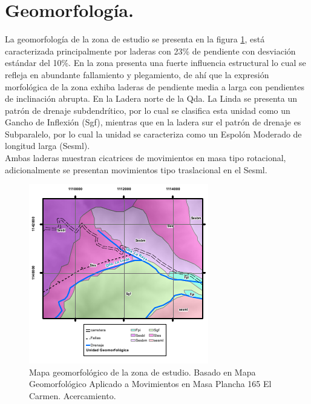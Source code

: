 \section{Geomorfolog\'{i}a.}
La geomorfolog\'{i}a de la zona de estudio se presenta en la figura \ref{fig:mapageomorfo}, est\'{a} caracterizada principalmente por laderas con 23\% de pendiente con desviaci\'{o}n est\'{a}ndar del 10\%.
En la zona presenta una fuerte influencia estructural lo cual se refleja en abundante fallamiento y plegamiento, de ah\'i que la expresi\'{o}n morfol\'{o}gica de la zona exhiba laderas de pendiente media a larga con pendientes de inclinaci\'{o}n abrupta. En la Ladera norte de la Qda. La Linda se presenta un patr\'{o}n de drenaje subdendr\'{i}tico, por lo cual se clasifica esta unidad como un Gancho de Inflexi\'{o}n (Sgf), mientras que en la ladera sur el patr\'{o}n de drenaje es Subparalelo, por lo cual la unidad se caracteriza como un Espol\'{o}n Moderado de longitud larga (Sesml).  \\
Ambas laderas muestran cicatrices de movimientos en masa tipo rotacional, adicionalmente se presentan movimientos tipo traslacional en el Sesml.\cite{urrao} 
 \par


\begin{figure}[H]
\centering

\includegraphics[width=.8\textwidth]{img/geomorfo.pdf}
\caption{Mapa geomorfol\'{o}gico de la zona de estudio. Basado en Mapa Geomorfol\'{o}gico Aplicado a Movimientos en Masa Plancha 165 El Carmen. Acercamiento.}

\label{fig:mapageomorfo}
\end{figure}